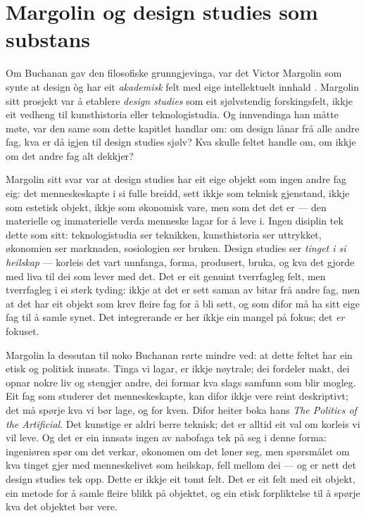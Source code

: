 \section{Margolin og design studies som substans}

Om Buchanan gav den filosofiske grunngjevinga, var det Victor Margolin som synte at design òg har eit \emph{akademisk} felt med eige intellektuelt innhald \autocite{margolin2002politics}. Margolin sitt prosjekt var å etablere \emph{design studies} som eit sjølvstendig forskingsfelt, ikkje eit vedheng til kunsthistoria eller teknologistudia. Og innvendinga han måtte møte, var den same som dette kapitlet handlar om: om design lånar frå alle andre fag, kva er då igjen til design studies sjølv? Kva skulle feltet handle om, om ikkje om det andre fag alt dekkjer?

Margolin sitt svar var at design studies har eit eige objekt som ingen andre fag eig: det menneskeskapte i si fulle breidd, sett ikkje som teknisk gjenstand, ikkje som estetisk objekt, ikkje som økonomisk vare, men som det det er — den materielle og immaterielle verda menneske lagar for å leve i. Ingen disiplin tek dette som sitt: teknologistudia ser teknikken, kunsthistoria ser uttrykket, økonomien ser marknaden, sosiologien ser bruken. Design studies ser \emph{tinget i si heilskap} — korleis det vart unnfanga, forma, produsert, bruka, og kva det gjorde med liva til dei som lever med det. Det er eit genuint tverrfagleg felt, men tverrfagleg i ei sterk tyding: ikkje at det er sett saman av bitar frå andre fag, men at det har eit objekt som krev fleire fag for å bli sett, og som difor må ha sitt eige fag til å samle synet. Det integrerande er her ikkje ein mangel på fokus; det \emph{er} fokuset.

Margolin la dessutan til noko Buchanan rørte mindre ved: at dette feltet har ein etisk og politisk innsats. Tinga vi lagar, er ikkje nøytrale; dei fordeler makt, dei opnar nokre liv og stengjer andre, dei formar kva slags samfunn som blir mogleg. Eit fag som studerer det menneskeskapte, kan difor ikkje vere reint deskriptivt; det må spørje kva vi bør lage, og for kven. Difor heiter boka hans \emph{The Politics of the Artificial}. Det kunstige er aldri berre teknisk; det er alltid eit val om korleis vi vil leve. Og det er ein innsats ingen av nabofaga tek på seg i denne forma: ingeniøren spør om det verkar, økonomen om det løner seg, men spørsmålet om kva tinget gjer med menneskelivet som heilskap, fell mellom dei — og er nett det design studies tek opp. Dette er ikkje eit tomt felt. Det er eit felt med eit objekt, ein metode for å samle fleire blikk på objektet, og ein etisk forpliktelse til å spørje kva det objektet bør vere.


